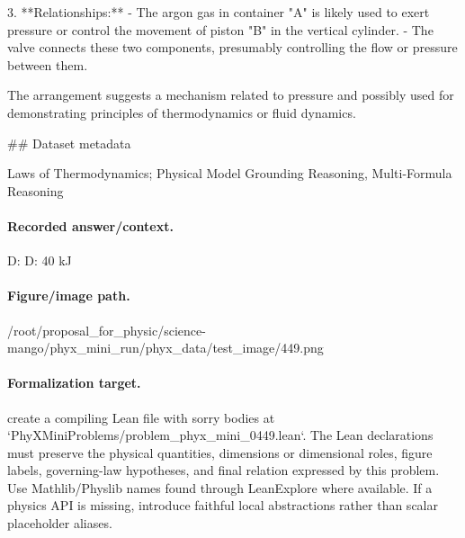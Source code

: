 3. **Relationships:**
   - The argon gas in container "A" is likely used to exert pressure or control the movement of piston "B" in the vertical cylinder.
   - The valve connects these two components, presumably controlling the flow or pressure between them.

The arrangement suggests a mechanism related to pressure and possibly used for demonstrating principles of thermodynamics or fluid dynamics.

\#\# Dataset metadata

Laws of Thermodynamics; Physical Model Grounding Reasoning, Multi-Formula Reasoning

\paragraph{Recorded answer/context.}
D: D: 40 kJ

\paragraph{Figure/image path.}
/root/proposal\_for\_physic/science-mango/phyx\_mini\_run/phyx\_data/test\_image/449.png

\paragraph{Formalization target.}
create a compiling Lean file with sorry bodies at `PhyXMiniProblems/problem\_phyx\_mini\_0449.lean`. The Lean declarations must preserve the physical quantities, dimensions or dimensional roles, figure labels, governing-law hypotheses, and final relation expressed by this problem.
Use Mathlib/Physlib names found through LeanExplore where available. If a physics API is missing, introduce faithful local abstractions rather than scalar placeholder aliases.

